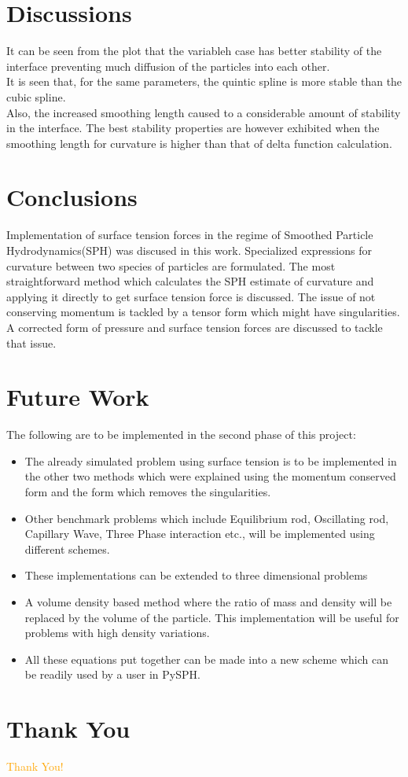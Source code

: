 \documentclass{beamer}
\begin{document}
\section{Discussions}
\begin{frame}
It can be seen from the plot that the variableh case has better stability of the interface preventing much diffusion of the particles into each other.\\

It is seen that, for the same parameters, the quintic spline is more stable than the cubic spline.\\

Also, the increased smoothing length caused to a considerable amount of stability in the interface. The best stability properties are however exhibited when the smoothing length for curvature is higher than that of delta function calculation.
\end{frame}

\section{Conclusions}
\begin{frame}
 Implementation of surface tension forces in the regime of Smoothed Particle Hydrodynamics(SPH) was discused in this work. 
 Specialized expressions for curvature between two species of particles are formulated. The most straightforward method which calculates the SPH estimate of curvature and applying it directly to get surface tension force is discussed. 
 The issue of not conserving momentum is tackled by a tensor form which might have singularities. 
 A corrected form of pressure and surface tension forces are discussed to tackle that issue.
\end{frame}

\section{Future Work}
\begin{frame}
The following are to be implemented in the second phase of this project:
\begin{itemize}
 \item The already simulated problem using surface tension is to be implemented in the other two methods which were explained using the momentum conserved form and the form 
 which removes the singularities.
 \item Other benchmark problems which include Equilibrium rod, Oscillating rod, Capillary Wave, Three Phase interaction etc.,
 will be implemented using different schemes.
 \item These implementations can be extended to three dimensional problems
 \item A volume density based method where the ratio of mass and density will be replaced
 by the volume of the particle. This implementation will be useful for problems with high density variations.
  \item All these equations put together can be made into a new scheme which can be readily
  used by a user in PySPH.
 \end{itemize}
\end{frame}

\section*{Thank You}
\begin{frame}
\centering
\Huge{\textcolor{orange}{Thank You!}}
\end{frame}
\end{document}
